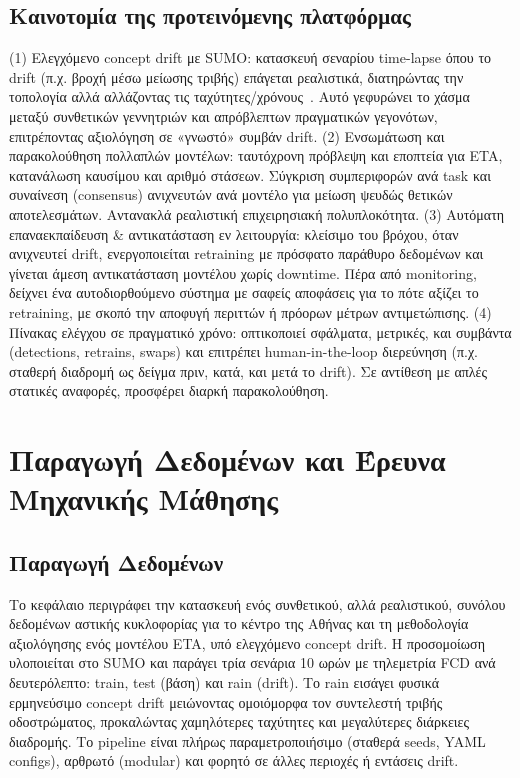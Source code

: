 \subsection*{Καινοτομία της προτεινόμενης πλατφόρμας}
(1) Ελεγχόμενο concept drift με SUMO: κατασκευή σεναρίου time-lapse όπου το drift (π.χ. βροχή μέσω μείωσης τριβής) επάγεται ρεαλιστικά, διατηρώντας την τοπολογία αλλά αλλάζοντας τις ταχύτητες/χρόνους~\cite{sumo2019friction}.
Αυτό γεφυρώνει το χάσμα μεταξύ συνθετικών γεννητριών και απρόβλεπτων πραγματικών γεγονότων, επιτρέποντας αξιολόγηση σε «γνωστό» συμβάν drift.
(2) Ενσωμάτωση και παρακολούθηση πολλαπλών μοντέλων: ταυτόχρονη πρόβλεψη και εποπτεία για ETA, κατανάλωση καυσίμου και αριθμό στάσεων.
Σύγκριση συμπεριφορών ανά task και συναίνεση (consensus) ανιχνευτών ανά μοντέλο για μείωση ψευδώς θετικών αποτελεσμάτων.
Αντανακλά ρεαλιστική επιχειρησιακή πολυπλοκότητα.
(3) Αυτόματη επαναεκπαίδευση \& αντικατάσταση εν λειτουργία: κλείσιμο του βρόχου, όταν ανιχνευτεί drift, ενεργοποιείται retraining με πρόσφατο παράθυρο δεδομένων και γίνεται άμεση αντικατάσταση μοντέλου χωρίς downtime.
Πέρα από monitoring, δείχνει ένα αυτοδιορθούμενο σύστημα με σαφείς αποφάσεις για το πότε αξίζει το retraining, με σκοπό την αποφυγή περιττών ή πρόορων μέτρων αντιμετώπισης.
(4) Πίνακας ελέγχου σε πραγματικό χρόνο: οπτικοποιεί σφάλματα, μετρικές, και συμβάντα (detections, retrains, swaps) και επιτρέπει human-in-the-loop διερεύνηση (π.χ. σταθερή διαδρομή ως δείγμα πριν, κατά, και μετά το drift).
Σε αντίθεση με απλές στατικές αναφορές, προσφέρει διαρκή παρακολούθηση.

\section*{Παραγωγή Δεδομένων και Έρευνα Μηχανικής Μάθησης}

\subsection*{Παραγωγή Δεδομένων}
Το κεφάλαιο περιγράφει την κατασκευή ενός συνθετικού, αλλά ρεαλιστικού, συνόλου δεδομένων αστικής κυκλοφορίας για το κέντρο της Αθήνας και τη μεθοδολογία αξιολόγησης ενός μοντέλου ETA, υπό ελεγχόμενο concept drift.
Η προσομοίωση υλοποιείται στο SUMO και παράγει τρία σενάρια 10 ωρών με τηλεμετρία FCD ανά δευτερόλεπτο: train, test (βάση) και rain (drift).
Το rain εισάγει φυσικά ερμηνεύσιμο concept drift μειώνοντας ομοιόμορφα τον συντελεστή τριβής οδοστρώματος, προκαλώντας χαμηλότερες ταχύτητες και μεγαλύτερες διάρκειες διαδρομής.
Το pipeline είναι πλήρως παραμετροποιήσιμο (σταθερά seeds, YAML configs), αρθρωτό (modular) και φορητό σε άλλες περιοχές ή εντάσεις drift.

